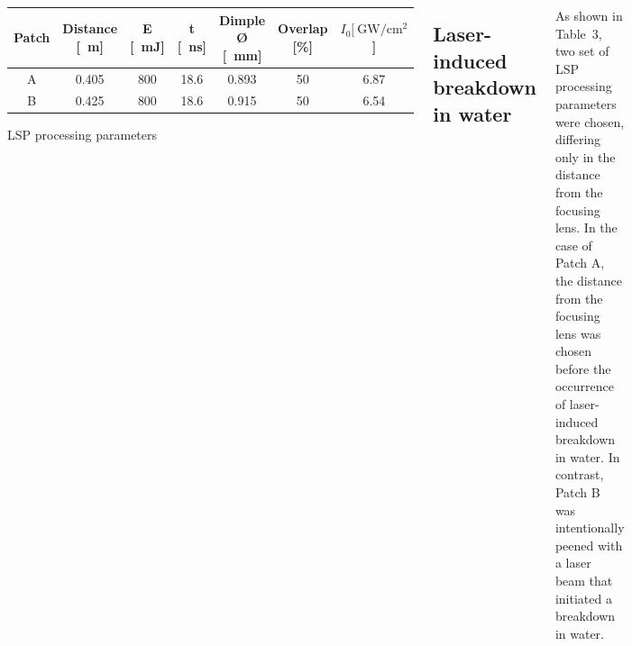 \documentclass[20pt,margin=1in,innermargin=-4.5in,blockverticalspace=-0.25in]{tikzposter}
\begin{document}
\begin{columns}
{\begin{center}
    \begin{threeparttable}
        \centering
        \begin{tabular}{|c|c | c| c| c| c| c|} 
        \hline
           \textbf{Patch} & \textbf{Distance [\SI{}{\m}]} & \textbf{E [\SI{}{\milli\joule}]} & \textbf{t [\SI{}{\ns}]} & \textbf{Dimple Ø [\SI{}{ \mm}]}  & \textbf{Overlap [\%] } & \textbf{\( I_0  [\SI[]{}{\giga\watt/\cm^2} \)] }\\ [0.5ex] 
  
        \hline
         A & 0.405 &  800   & 18.6 & 0.893 & 50 & 6.87  \\

        \hline
         B & 0.425 &  800   & 18.6 & 0.915 & 50 & 6.54  \\

        \hline
        \end{tabular}

        \caption[Litron~LPY~ST~7875-10~2HG parameters]{LSP processing parameters}
        
       
    \end{threeparttable}

    \label{tab:xrdparameters}
    \end{center}

    
    \subsection*{Laser-induced breakdown in water}
    As shown in Table~3, two set of LSP processing parameters were chosen, differing only in the distance from the focusing lens. In the case of Patch A, the distance from the focusing lens was chosen before the occurrence of laser-induced breakdown in water. In contrast, Patch B was intentionally peened with a laser beam that initiated a breakdown in water.  


    }




\end{columns}
\end{document}
